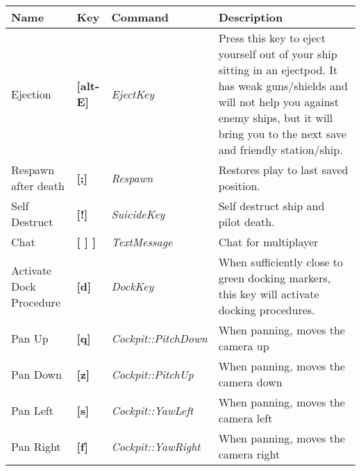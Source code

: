 \documentclass{article}
\begin{document}
\begin{tabular}{|p{0.8in}|p{0.4in}|p{1.1in}|p{2.5in}|} \hline 
\textbf{ Name } & \textbf{Key } & \textbf{ Command } & \textbf{Description } \\ \hline 
Ejection  & \textbf{[alt-E] } & \textit{EjectKey } & Press this key to eject yourself out of your ship sitting in an ejectpod. It has weak guns/shields and will not help you against enemy ships, but it will bring you to the next save and friendly station/ship.  \\ \hline 
Respawn after death  & \textbf{[;] } & \textit{Respawn } & Restores play to last saved position.  \\ \hline 
Self Destruct  & \textbf{[!] } & \textit{SuicideKey } & Self destruct ship and pilot death.  \\ \hline 
Chat  & \textbf{[ ] ] } & \textit{TextMessage} & Chat for multiplayer \\ \hline 
Activate Dock Procedure  & \textbf{[d] } & \textit{DockKey } & When sufficiently close to green docking markers, this key will activate docking procedures.  \\ \hline 
Pan Up  & \textbf{[q] } & \textit{Cockpit::PitchDown } & When panning, moves the camera up  \\ \hline 
Pan Down  & \textbf{[z] } & \textit{Cockpit::PitchUp } & When panning, moves the camera down  \\ \hline 
Pan Left  & \textbf{[s] } & \textit{Cockpit::YawLeft } & When panning, moves the camera left  \\ \hline 
Pan Right  & \textbf{[f] } & \textit{Cockpit::YawRight } & When panning, moves the camera right  \\ \hline 
\end{tabular}

\textbf{ }
\end{document}
